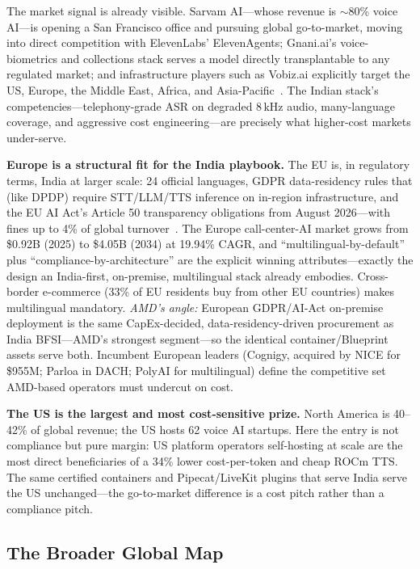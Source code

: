 \documentclass[blind]{gtac}
\begin{document}
The market signal is already visible. Sarvam AI---whose revenue is $\sim$80\% voice AI---is opening a San Francisco office and pursuing global go-to-market, moving into direct competition with ElevenLabs' ElevenAgents; Gnani.ai's voice-biometrics and collections stack serves a model directly transplantable to any regulated market; and infrastructure players such as Vobiz.ai explicitly target the US, Europe, the Middle East, Africa, and Asia-Pacific~\cite{inc42_sarvam}. The Indian stack's competencies---telephony-grade ASR on degraded 8\,kHz audio, many-language coverage, and aggressive cost engineering---are precisely what higher-cost markets under-serve.

\textbf{Europe is a structural fit for the India playbook.} The EU is, in regulatory terms, India at larger scale: 24 official languages, GDPR data-residency rules that (like DPDP) require STT/LLM/TTS inference on in-region infrastructure, and the EU AI Act's Article 50 transparency obligations from August 2026---with fines up to 4\% of global turnover~\cite{telnyx_europe,marketdata_europe}. The Europe call-center-AI market grows from \$0.92B (2025) to \$4.05B (2034) at 19.94\% CAGR, and ``multilingual-by-default'' plus ``compliance-by-architecture'' are the explicit winning attributes---exactly the design an India-first, on-premise, multilingual stack already embodies. Cross-border e-commerce (33\% of EU residents buy from other EU countries) makes multilingual mandatory. \emph{AMD's angle:} European GDPR/AI-Act on-premise deployment is the same CapEx-decided, data-residency-driven procurement as India BFSI---AMD's strongest segment---so the identical container/Blueprint assets serve both. Incumbent European leaders (Cognigy, acquired by NICE for \$955M; Parloa in DACH; PolyAI for multilingual) define the competitive set AMD-based operators must undercut on cost.

\textbf{The US is the largest and most cost-sensitive prize.} North America is 40--42\% of global revenue; the US hosts 62 voice AI startups. Here the entry is not compliance but pure margin: US platform operators self-hosting at scale are the most direct beneficiaries of a 34\% lower cost-per-token and cheap ROCm TTS. The same certified containers and Pipecat/LiveKit plugins that serve India serve the US unchanged---the go-to-market difference is a cost pitch rather than a compliance pitch.

\subsection{The Broader Global Map}
\end{document}
